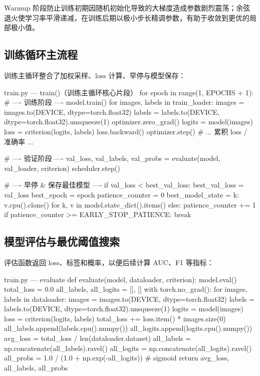 \documentclass[12pt,a4paper]{ctexart}
\begin{document}
Warmup 阶段防止训练初期因随机初始化导致的大梯度造成参数剧烈震荡；余弦退火使学习率平滑递减，在训练后期以极小步长精调参数，有助于收敛到更优的局部极小值。

\subsection{训练循环主流程}

训练主循环整合了加权采样、loss 计算、早停与模型保存：

\begin{pythoncode}{train.py — train()（训练主循环核心片段）}
for epoch in range(1, EPOCHS + 1):
    # ---- 训练阶段 ----
    model.train()
    for images, labels in train_loader:
        images = images.to(DEVICE, dtype=torch.float32)
        labels = labels.to(DEVICE, dtype=torch.float32).unsqueeze(1)
        optimizer.zero_grad()
        logits = model(images)
        loss = criterion(logits, labels)
        loss.backward()
        optimizer.step()
        # ... 累积 loss / 准确率 ...

    # ---- 验证阶段 ----
    val_loss, val_labels, val_probs = evaluate(model, val_loader, criterion)
    scheduler.step()

    # ---- 早停 & 保存最佳模型 ----
    if val_loss < best_val_loss:
        best_val_loss = val_loss
        best_epoch = epoch
        patience_counter = 0
        best_model_state = {k: v.cpu().clone()
                            for k, v in model.state_dict().items()}
    else:
        patience_counter += 1
        if patience_counter >= EARLY_STOP_PATIENCE:
            break
\end{pythoncode}

\subsection{模型评估与最优阈值搜索}

评估函数返回 loss、标签和概率，以便后续计算 AUC、F1 等指标：

\begin{pythoncode}{train.py — evaluate}
def evaluate(model, dataloader, criterion):
    model.eval()
    total_loss = 0.0
    all_labels, all_logits = [], []
    with torch.no_grad():
        for images, labels in dataloader:
            images = images.to(DEVICE, dtype=torch.float32)
            labels = labels.to(DEVICE, dtype=torch.float32).unsqueeze(1)
            logits = model(images)
            loss = criterion(logits, labels)
            total_loss += loss.item() * images.size(0)
            all_labels.append(labels.cpu().numpy())
            all_logits.append(logits.cpu().numpy())
    avg_loss = total_loss / len(dataloader.dataset)
    all_labels = np.concatenate(all_labels).ravel()
    all_logits = np.concatenate(all_logits).ravel()
    all_probs = 1.0 / (1.0 + np.exp(-all_logits))  # sigmoid
    return avg_loss, all_labels, all_probs
\end{pythoncode}
\end{document}
